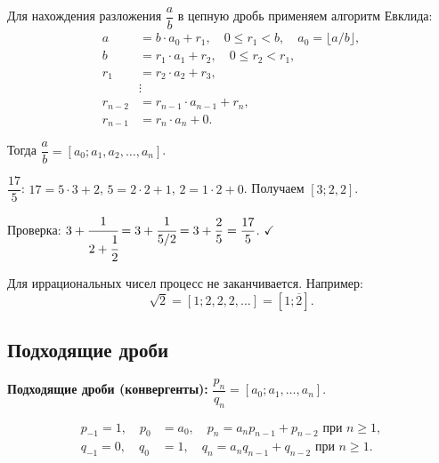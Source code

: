 \documentclass[12pt]{article}
\begin{document}
	Для нахождения разложения $\dfrac{a}{b}$ в цепную дробь применяем алгоритм Евклида:
	\begin{align*}
		a &= b \cdot a_0 + r_1, \quad 0 \leqslant r_1 < b, \quad a_0 = \lfloor a/b \rfloor, \\
		b &= r_1 \cdot a_1 + r_2, \quad 0 \leqslant r_2 < r_1, \\
		r_1 &= r_2 \cdot a_2 + r_3, \\
		&\vdots \\
		r_{n-2} &= r_{n-1} \cdot a_{n-1} + r_n, \\
		r_{n-1} &= r_n \cdot a_n + 0.
	\end{align*}
	
	Тогда $\dfrac{a}{b} = [a_0; a_1, a_2, \dots, a_n]$.
	
	\begin{example}
		$\dfrac{17}{5}$: $17 = 5 \cdot 3 + 2$, $5 = 2 \cdot 2 + 1$, $2 = 1 \cdot 2 + 0$. Получаем $[3; 2, 2]$.
		
		Проверка: $3 + \cfrac{1}{2 + \cfrac{1}{2}} = 3 + \cfrac{1}{5/2} = 3 + \dfrac{2}{5} = \dfrac{17}{5}$. $\checkmark$
	\end{example}
	
	Для иррациональных чисел процесс не заканчивается. Например:
	\[\sqrt{2} = [1; 2, 2, 2, \dots] = [1; \overline{2}].\]
	
	\subsection{Подходящие дроби}
	
	\begin{definition}
		\textbf{Подходящие дроби (конвергенты):} $\dfrac{p_n}{q_n} = [a_0; a_1, \dots, a_n]$.
	\end{definition}
	
	\begin{theorem}
		\begin{align*}
			p_{-1} = 1, \quad p_0 &= a_0, \quad p_n = a_n p_{n-1} + p_{n-2} \text{ при } n \geqslant 1, \\
			q_{-1} = 0, \quad q_0 &= 1, \quad q_n = a_n q_{n-1} + q_{n-2} \text{ при } n \geqslant 1.
		\end{align*}
	\end{theorem}
	
\end{document}
